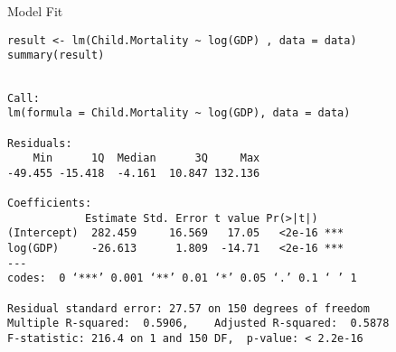 \documentclass[presentation]{beamer}
\begin{document}
\begin{frame}[fragile,shrink=15,label={sec:org7717e46}]{Model Fit}
 \begin{verbatim}
result <- lm(Child.Mortality ~ log(GDP) , data = data)
summary(result)
\end{verbatim}

\begin{verbatim}

Call:
lm(formula = Child.Mortality ~ log(GDP), data = data)

Residuals:
    Min      1Q  Median      3Q     Max 
-49.455 -15.418  -4.161  10.847 132.136 

Coefficients:
            Estimate Std. Error t value Pr(>|t|)    
(Intercept)  282.459     16.569   17.05   <2e-16 ***
log(GDP)     -26.613      1.809  -14.71   <2e-16 ***
---
codes:  0 ‘***’ 0.001 ‘**’ 0.01 ‘*’ 0.05 ‘.’ 0.1 ‘ ’ 1

Residual standard error: 27.57 on 150 degrees of freedom
Multiple R-squared:  0.5906,	Adjusted R-squared:  0.5878 
F-statistic: 216.4 on 1 and 150 DF,  p-value: < 2.2e-16
\end{verbatim}
\end{frame}
\end{document}
